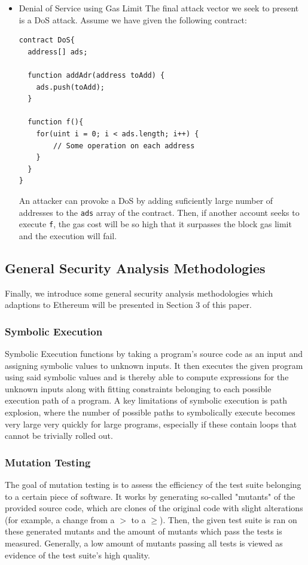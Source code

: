 \documentclass[letterpaper,twocolumn,10pt]{article}
\begin{document}
\begin{itemize}
	\item Denial of Service using Gas Limit
	The final attack vector we seek to present is a DoS attack. Assume we have given the following contract:
	
\begin{verbatim}
contract DoS{
  address[] ads;

  function addAdr(address toAdd) { 
    ads.push(toAdd);
  }

  function f(){
    for(uint i = 0; i < ads.length; i++) { 
        // Some operation on each address
    }
  }
}
\end{verbatim}

An attacker can provoke a DoS by adding suficiently large number of addresses to the \verb|ads| array of the contract. Then, if another account seeks to execute \verb|f|, the gas cost will be so high that it surpasses the block gas limit and the execution will fail.
  
  \end{itemize}

\subsection{General Security Analysis Methodologies}

Finally, we introduce some general security analysis methodologies which adaptions to Ethereum will be presented in Section 3 of this paper. 

\subsubsection{Symbolic Execution}

Symbolic Execution functions by taking a program's source code as an input and assigning symbolic values to unknown inputs. It then executes the given program using said symbolic values and is thereby able to compute expressions for the unknown inputs along with fitting constraints belonging to each possible execution path of a program. A key limitations of symbolic execution is path explosion, where the number of possible paths to symbolically execute becomes very large very quickly for large programs, especially if these contain loops that cannot be trivially rolled out.

\subsubsection{Mutation Testing}
The goal of mutation testing is to assess the efficiency of the test suite belonging to a certain piece of software. It works by generating so-called "mutants" of the provided source code, which are clones of the original code with slight alterations (for example, a change from a $>$ to a $\geq$). Then, the given test suite is ran on these generated mutants and the amount of mutants which pass the tests is measured. Generally, a low amount of mutants passing all tests is viewed as evidence of the test suite's high quality.
\end{document}
